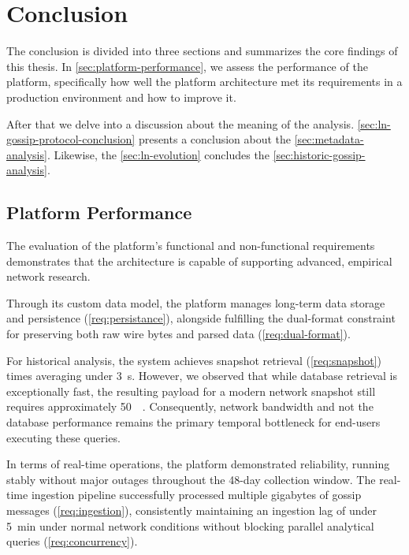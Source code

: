 \chapter{Conclusion}
\label{ch:conclusion}

The conclusion is divided into three sections and summarizes the core findings of this thesis.
In \autoref{sec:platform-performance}, we assess the performance of the  platform,
specifically how well the platform architecture met its requirements in a production environment and how to improve it.

After that we delve into a discussion about the meaning of the analysis.
\autoref{sec:ln-gossip-protocol-conclusion} presents a conclusion about the \autoref{sec:metadata-analysis}.
Likewise, the \autoref{sec:ln-evolution} concludes the \autoref{sec:historic-gossip-analysis}.


\section{ Platform Performance}
\label{sec:platform-performance} 

The evaluation of the platform's functional and non-functional requirements demonstrates
that the  architecture is capable of supporting advanced, empirical network research.

Through its custom data model, the platform manages long-term data storage and persistence (\ref{req:persistance}), 
alongside fulfilling the dual-format constraint for preserving both raw wire bytes and parsed data (\ref{req:dual-format}). 

For historical analysis, the system achieves snapshot retrieval (\ref{req:snapshot}) times averaging under \qty{3}{\second}.
However, we observed that while database retrieval is exceptionally fast, 
the resulting payload for a modern network snapshot still requires approximately \qty{50}{\mega\byte}. 
Consequently, network bandwidth and not the database performance remains 
the primary temporal bottleneck for end-users executing these queries.

In terms of real-time operations, the platform demonstrated reliability, 
running stably without major outages throughout the 48-day collection window. 
The real-time ingestion pipeline successfully processed multiple gigabytes of gossip messages (\ref{req:ingestion}), 
consistently maintaining an ingestion lag of under \qty{5}{\minute} under normal network conditions
without blocking parallel analytical queries (\ref{req:concurrency}). 

